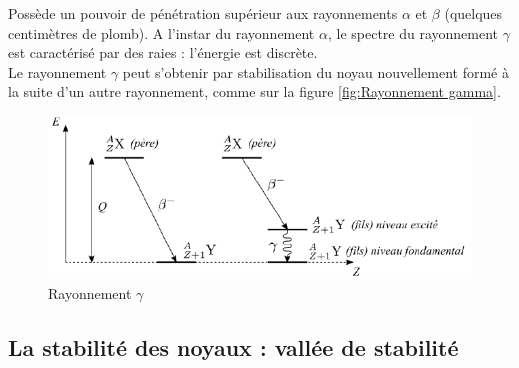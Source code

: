 Possède un pouvoir de pénétration supérieur aux rayonnements $\alpha$ et $\beta$ (quelques centimètres de plomb). A l'instar du rayonnement $\alpha$, le spectre du rayonnement $\gamma$ est caractérisé par des raies : l'énergie est discrète.\\
Le rayonnement $\gamma$ peut s'obtenir par stabilisation du noyau nouvellement formé à la suite d'un autre rayonnement, comme sur la figure \eqref{fig:Rayonnement gamma}.
\begin{figure}[H]
    \centering
    \includegraphics[scale=0.7]{Images1/gamma.PNG}
    \caption{Rayonnement $\gamma$}
    \label{fig:Rayonnement gamma}
\end{figure}


\subsection{La stabilité des noyaux : vallée de stabilité}

